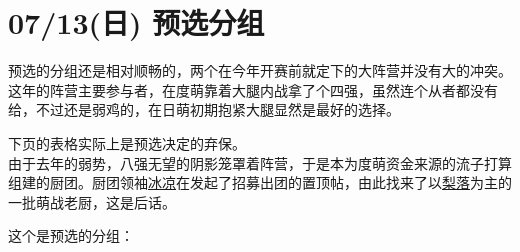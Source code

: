 \section{07/13(日) 预选分组}

预选的分组还是相对顺畅的，两个在今年开赛前就定下的大阵营并没有大的冲突。这年的阵营主要参与者，在度萌靠着大腿内战拿了个四强，虽然连个从者都没有给，不过还是弱鸡的，在日萌初期抱紧大腿显然是最好的选择。

下页的表格实际上是预选决定的弃保。
\\

由于去年的弱势，八强无望的阴影笼罩着阵营，于是本为度萌资金来源的流子打算组建的厨团。厨团领袖\uline{冰凉}在发起了招募出团的置顶帖，由此找来了以\uline{梨落}为主的一批萌战老厨，这是后话。

这个是预选的分组：

